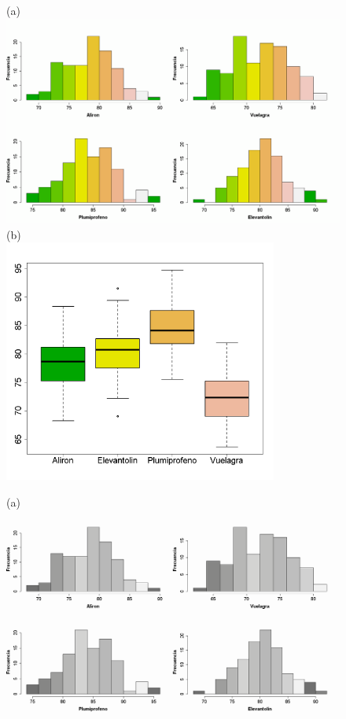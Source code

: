 \begin{figure}[p]
\begin{center}
\begin{enColor}
(a)\\
\includegraphics[width=14cm]{../fig/Cap11-HistogramasGrupos.png}\\[3mm]
(b)\\
\includegraphics[width=9cm]{../fig/Cap11-BoxplotsParalelos.png}\\
\end{enColor}
\begin{bn}
(a)\\
\includegraphics[width=14cm]{../fig/Cap11-HistogramasGrupos-bn.png}\\[3mm]

\end{bn}
\end{center}
\end{figure}
